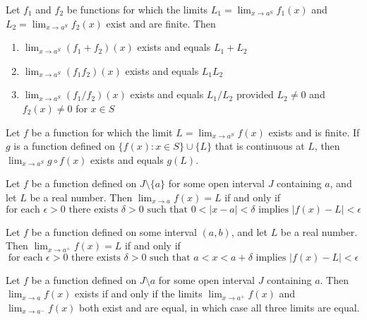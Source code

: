 \documentclass[10pt]{article}
\begin{document}
\begin{thm}
Let $f_1$ and $f_2$ be functions for which the limits $L_1 = \lim_{x\to a^S}f_1(x)$ and $L_2=\lim_{x\to a^S}f_2(x)$ exist and are finite. Then
\begin{enumerate}
    \item $\lim_{x\to a^S}(f_1+f_2)(x)$ exists and equals $L_1 + L_2$
    \item $\lim_{x\to a^S}(f_1f_2)(x)$ exists and equals $L_1L_2$
    \item $\lim_{x\to a^S}(f_1/f_2)(x)$ exists and equals $L_1/L_2$ provided $L_2\neq 0$ and $f_2(x)\neq 0$ for $x\in S$
\end{enumerate}
\end{thm}

\begin{thm}
Let $f$ be a function for which the limit $L=\lim_{x\to a^S}f(x)$ exists and is finite. If $g$ is a function defined on $\{f(x): x\in S\}\cup\{L\}$ that is continuous at $L$, then $\lim_{x\to a^S}g\circ f(x)$ exists and equals $g(L)$.
\end{thm}

\begin{cor}
Let $f$ be a function defined on $J\setminus \{a\}$ for some open interval $J$ containing $a$, and let $L$ be a real number. Then $\lim_{x\to a}f(x) = L$ if and only if
\begin{equation*}
    \text{for each $\epsilon > 0$ there exists $\delta > 0 $ such that $0<|x-a|<\delta$ implies $|f(x)-L|<\epsilon$}
\end{equation*}
\end{cor}

\begin{cor}
Let $f$ be a function defined on some interval $(a, b)$, and let $L$ be a real number. Then $\lim_{x\to a^+}f(x) = L$ if and only if
\begin{equation*}
    \text{for each $\epsilon > 0$ there exists $\delta >0$ such that $a < x < a + \delta$ implies $|f(x) - L| < \epsilon$}
\end{equation*}
\end{cor}

\begin{thm}
Let $f$ be a function defined on $J \setminus {a}$ for some open interval $J$ containing $a$. Then $\lim_{x \to a}f(x)$ exists if and only if the limits $\lim_{x \to a^+} f(x)$ and $\lim_{x \to a^-}f(x)$ both exist and are equal, in which case all three limits are equal.
\end{thm}
\end{document}
